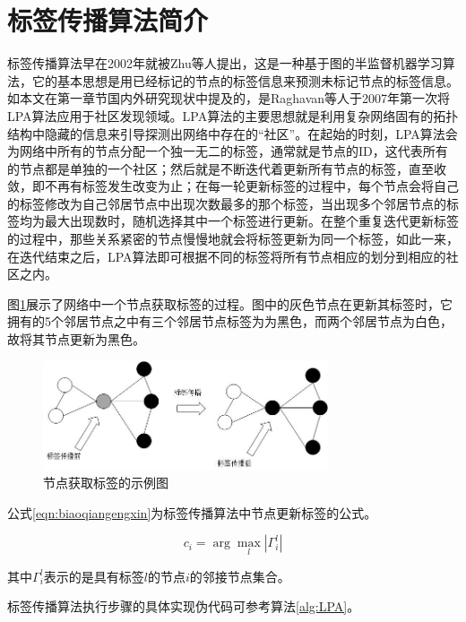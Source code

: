 \section{标签传播算法简介}

标签传播算法早在2002年就被Zhu等人\cite{Zhu2002Learning}提出，这是一种基于图的半监督机器学习算法，它的基本思想是用已经标记的节点的标签信息来预测未标记节点的标签信息。如本文在第一章节国内外研究现状中提及的，是Raghavan等人\cite{Raghavan2007Near}于2007年第一次将LPA算法应用于社区发现领域。LPA算法的主要思想就是利用复杂网络固有的拓扑结构中隐藏的信息来引导探测出网络中存在的“社区”。在起始的时刻，LPA算法会为网络中所有的节点分配一个独一无二的标签，通常就是节点的ID，这代表所有的节点都是单独的一个社区；然后就是不断迭代着更新所有节点的标签，直至收敛，即不再有标签发生改变为止；在每一轮更新标签的过程中，每个节点会将自己的标签修改为自己邻居节点中出现次数最多的那个标签，当出现多个邻居节点的标签均为最大出现数时，随机选择其中一个标签进行更新。在整个重复迭代更新标签的过程中，那些关系紧密的节点慢慢地就会将标签更新为同一个标签，如此一来，在迭代结束之后，LPA算法即可根据不同的标签将所有节点相应的划分到相应的社区之内。

图\ref{fig:dingdianbiaoqianchuanbo}展示了网络中一个节点获取标签的过程。图中的灰色节点在更新其标签时，它拥有的5个邻居节点之中有三个邻居节点标签为为黑色，而两个邻居节点为白色，故将其节点更新为黑色。

\begin{figure}
  \centering
  \includegraphics[width=0.75\textwidth]{figures/dingdianbiaoqianchuanbo}
  \caption{节点获取标签的示例图}\label{fig:dingdianbiaoqianchuanbo}
 \end{figure}

公式\ref{eqn:biaoqiangengxin}为标签传播算法中节点更新标签的公式。

\begin{equation}
  \label{eqn:biaoqiangengxin}
  c_i=\arg\max_l \left | \Gamma _i^l \right |
\end{equation}

其中$\Gamma _i^l$表示的是具有标签$l$的节点$i$的邻接节点集合。

标签传播算法执行步骤的具体实现伪代码可参考算法\ref{alg:LPA}。

